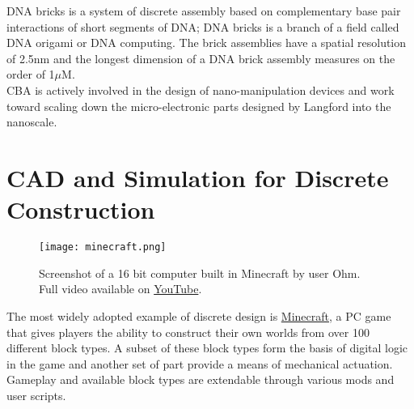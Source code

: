 {DNA bricks is a system of discrete assembly based on complementary base pair interactions of short segments of DNA\cite{Ke2012}; DNA bricks is a branch of a field called DNA origami\cite{Rothemund2006} or DNA computing\cite{Seeman1982}\cite{Adleman1994}.  The brick assemblies have a spatial resolution of 2.5nm and the longest dimension of a DNA brick assembly measures on the order of 1$\mu$M\cite{Ke2014}.
\\

CBA is actively involved in the design of nano-manipulation devices and work toward scaling down the micro-electronic parts designed by Langford\cite{Langford2014} into the nanoscale.

\section{CAD and Simulation for Discrete Construction}


\begin{figure}
  \texttt{[image: minecraft.png]}
  \caption{Screenshot of a 16 bit computer built in Minecraft by user Ohm.  Full video available on \href{https://www.youtube.com/watch?v=KzrFzkb3A4o}{YouTube}.}
  \label{fig:minecraft}
\end{figure}
The most widely adopted example of discrete design is \href{https://minecraft.net/}{Minecraft}, a PC game that gives players the ability to construct their own worlds from over 100 different block types.  A subset of these block types form the basis of digital logic in the game and another set of part provide a means of mechanical actuation.  Gameplay and available block types are extendable through various mods and user scripts.
\\

}
